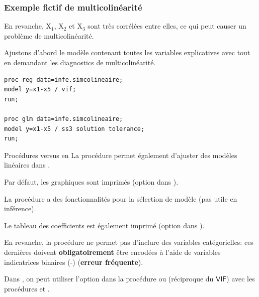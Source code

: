\documentclass[xcolor={dvipsnames}]{beamer}
\begin{document}
\begin{frame}[fragile]
\frametitle{Exemple fictif de multicolinéarité}
\bi
\item En revanche, $\mathrm{X}_1$, $\mathrm{X}_2$ et $\mathrm{X}_3$ sont très corrélées entre elles, ce qui peut causer un problème de multicolinéarité.
\item Ajustons d'abord le modèle contenant toutes les variables explicatives avec  tout en
demandant les diagnostics de multicolinéarité.
\vp \vp
\begin{tcolorbox}[colback=white,colframe=hecblue,title=Code \SASlang pour calculer les facteurs d'inflation de la variance]
\begin{verbatim}
proc reg data=infe.simcolineaire; 
model y=x1-x5 / vif; 
run;

proc glm data=infe.simcolineaire;
model y=x1-x5 / ss3 solution tolerance;
run;
\end{verbatim}
\end{tcolorbox}
\ei
\end{frame}
\begin{frame}{Procédures  versus  en \SASlang}
La procédure  permet également d'ajuster des modèles linéaires dans \SASlang.
\bi \item Par défaut, les graphiques sont imprimés (option  dans ).
\item La procédure  a des fonctionnalités pour la sélection de modèle (pas utile en inférence).
\item Le tableau des coefficients est également imprimé (option  dans ).
\item En revanche, la procédure  ne permet pas d'inclure des variables catégorielles: ces dernières doivent \textbf{obligatoirement} être encodées à l'aide de variables indicatrices binaires (-) (\textbf{erreur fréquente}).
\item  Dans \SASlang, on peut utiliser l'option  dans la procédure  ou  (réciproque du $\mathsf{VIF}$) avec les procédures  et .
\ei
 
\end{frame}
\end{document}
